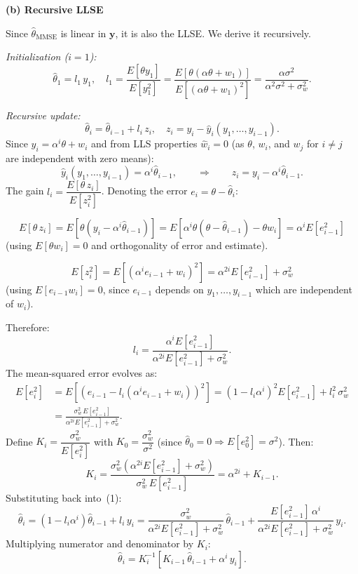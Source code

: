 \documentclass[12pt,a4paper,onecolumn]{exam}
\begin{document}
\begin{solution}
\textbf{(b) Recursive LLSE}

Since $\hat{\theta}_{\mathrm{MMSE}}$ is linear in $\mathbf{y}$, it is also the LLSE. We derive it recursively.

\emph{Initialization ($i=1$):}
\[
  \hat{\theta}_1 = l_1\, y_1, \quad
  l_1 = \frac{E[\theta y_1]}{E[y_1^2]}
       = \frac{E[\theta(\alpha\theta + w_1)]}{E[(\alpha\theta+w_1)^2]}
       = \frac{\alpha\sigma^2}{\alpha^2\sigma^2 + \sigma_w^2}.
\]

\emph{Recursive update:}
\[
  \hat{\theta}_i = \hat{\theta}_{i-1} + l_i\, z_i, \quad
  z_i = y_i - \hat{y}_i(y_1,\ldots,y_{i-1}). \tag{1}
\]
Since $y_i = \alpha^i\theta + w_i$ and from LLS properties $\hat{w}_i = 0$ (as $\theta$, $w_i$, and $w_j$ for $i\neq j$ are independent with zero means):
\[
  \hat{y}_i(y_1,\ldots,y_{i-1}) = \alpha^i\hat{\theta}_{i-1},
  \qquad\Rightarrow\qquad
  z_i = y_i - \alpha^i\hat{\theta}_{i-1}.
\]
The gain $l_i = \dfrac{E[\theta\, z_i]}{E[z_i^2]}$. Denoting the error $e_i = \theta - \hat{\theta}_i$:

\[
  E[\theta\, z_i]
    = E\!\left[\theta(y_i - \alpha^i\hat{\theta}_{i-1})\right]
    = E\!\left[\alpha^i\theta(\theta - \hat{\theta}_{i-1}) - \theta w_i\right]
    = \alpha^i E[e_{i-1}^2]
\]
(using $E[\theta w_i]=0$ and orthogonality of error and estimate).

\[
  E[z_i^2]
    = E\!\left[(\alpha^i e_{i-1} + w_i)^2\right]
    = \alpha^{2i} E[e_{i-1}^2] + \sigma_w^2
\]
(using $E[e_{i-1} w_i]=0$, since $e_{i-1}$ depends on $y_1,\ldots,y_{i-1}$ which are independent of $w_i$).

Therefore:
\[
  l_i = \frac{\alpha^i E[e_{i-1}^2]}{\alpha^{2i} E[e_{i-1}^2] + \sigma_w^2}.
\]
The mean-squared error evolves as:
\begin{align*}
  E[e_i^2]
    &= E\!\left[(e_{i-1} - l_i(\alpha^i e_{i-1} + w_i))^2\right]
     = (1 - l_i\alpha^i)^2 E[e_{i-1}^2] + l_i^2\,\sigma_w^2 \\
    &= \frac{\sigma_w^2\, E[e_{i-1}^2]}{\alpha^{2i} E[e_{i-1}^2] + \sigma_w^2}.
\end{align*}
Define $K_i = \dfrac{\sigma_w^2}{E[e_i^2]}$ with $K_0 = \dfrac{\sigma_w^2}{\sigma^2}$ (since $\hat{\theta}_0=0 \Rightarrow E[e_0^2]=\sigma^2$). Then:
\[
  K_i = \frac{\sigma_w^2(\alpha^{2i} E[e_{i-1}^2] + \sigma_w^2)}{\sigma_w^2\, E[e_{i-1}^2]}
      = \alpha^{2i} + K_{i-1}.
\]
Substituting back into~(1):
\[
  \hat{\theta}_i
    = (1 - l_i\alpha^i)\hat{\theta}_{i-1} + l_i\, y_i
    = \frac{\sigma_w^2}{\alpha^{2i} E[e_{i-1}^2]+\sigma_w^2}\,\hat{\theta}_{i-1}
      + \frac{E[e_{i-1}^2]\,\alpha^i}{\alpha^{2i} E[e_{i-1}^2]+\sigma_w^2}\, y_i.
\]
Multiplying numerator and denominator by $K_i$:
\[
  \boxed{\hat{\theta}_i = K_i^{-1}\!\left[K_{i-1}\,\hat{\theta}_{i-1} + \alpha^i\, y_i\right].}
\]


\end{solution}
\end{document}
